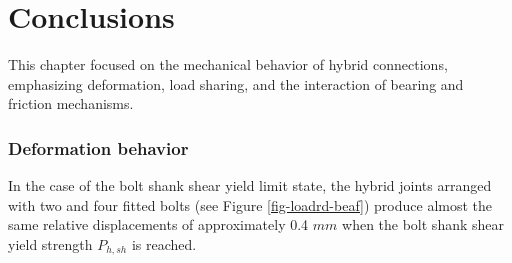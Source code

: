 


\section{Conclusions}

This chapter focused on the mechanical behavior of hybrid connections, emphasizing deformation, load sharing, and the interaction of bearing and friction mechanisms.


\subsubsection*{Deformation behavior}


 In the case of the bolt shank shear yield limit state, the hybrid joints arranged with two and four fitted bolts (see Figure \ref{fig-loadrd-beaf}) produce almost the same relative displacements of approximately 0.4 $mm$ when the bolt shank shear yield strength $P_{h,sh}$ is reached. 
    

